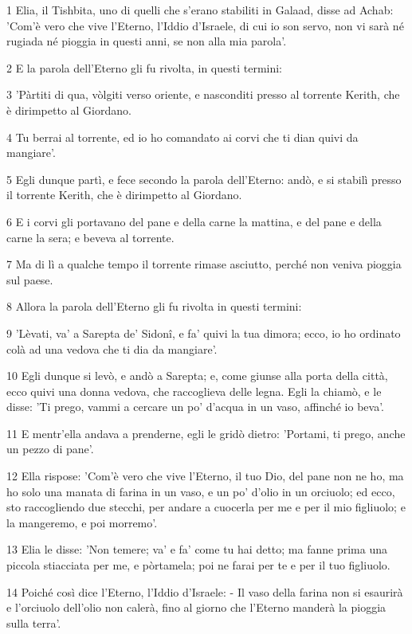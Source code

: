 \par 1 Elia, il Tishbita, uno di quelli che s'erano stabiliti in Galaad, disse ad Achab: 'Com'è vero che vive l'Eterno, l'Iddio d'Israele, di cui io son servo, non vi sarà né rugiada né pioggia in questi anni, se non alla mia parola'.
\par 2 E la parola dell'Eterno gli fu rivolta, in questi termini:
\par 3 'Pàrtiti di qua, vòlgiti verso oriente, e nasconditi presso al torrente Kerith, che è dirimpetto al Giordano.
\par 4 Tu berrai al torrente, ed io ho comandato ai corvi che ti dian quivi da mangiare'.
\par 5 Egli dunque partì, e fece secondo la parola dell'Eterno: andò, e si stabilì presso il torrente Kerith, che è dirimpetto al Giordano.
\par 6 E i corvi gli portavano del pane e della carne la mattina, e del pane e della carne la sera; e beveva al torrente.
\par 7 Ma di lì a qualche tempo il torrente rimase asciutto, perché non veniva pioggia sul paese.
\par 8 Allora la parola dell'Eterno gli fu rivolta in questi termini:
\par 9 'Lèvati, va' a Sarepta de' Sidonî, e fa' quivi la tua dimora; ecco, io ho ordinato colà ad una vedova che ti dia da mangiare'.
\par 10 Egli dunque si levò, e andò a Sarepta; e, come giunse alla porta della città, ecco quivi una donna vedova, che raccoglieva delle legna. Egli la chiamò, e le disse: 'Ti prego, vammi a cercare un po' d'acqua in un vaso, affinché io beva'.
\par 11 E mentr'ella andava a prenderne, egli le gridò dietro: 'Portami, ti prego, anche un pezzo di pane'.
\par 12 Ella rispose: 'Com'è vero che vive l'Eterno, il tuo Dio, del pane non ne ho, ma ho solo una manata di farina in un vaso, e un po' d'olio in un orciuolo; ed ecco, sto raccogliendo due stecchi, per andare a cuocerla per me e per il mio figliuolo; e la mangeremo, e poi morremo'.
\par 13 Elia le disse: 'Non temere; va' e fa' come tu hai detto; ma fanne prima una piccola stiacciata per me, e pòrtamela; poi ne farai per te e per il tuo figliuolo.
\par 14 Poiché così dice l'Eterno, l'Iddio d'Israele: - Il vaso della farina non si esaurirà e l'orciuolo dell'olio non calerà, fino al giorno che l'Eterno manderà la pioggia sulla terra'.
